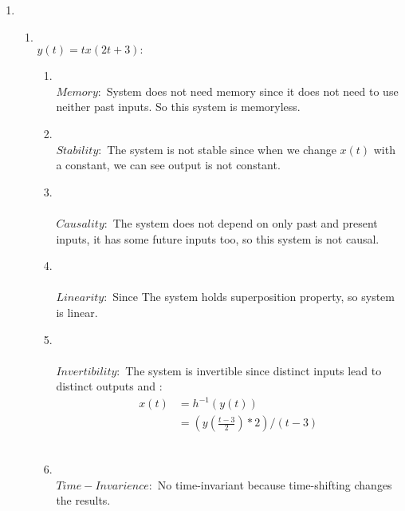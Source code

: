 \documentclass[10pt,a4paper, margin=1in]{article}
\begin{document}
\begin{enumerate}
\vspace{50}    
\item %
    \begin{enumerate}
    \item %
        \\$y(t) = tx(2t+3): $
        \\
        \begin{enumerate}
            \item
            \\$Memory: $
            System does not need memory since it does not need to use neither past inputs. So this system is memoryless.
            \\
            \item
            \\$Stability: $
            The system is not stable since when we change $x(t)$ with a constant, we can see output is not constant.
            \\
            \item
            \\\\$Causality: $
            The system does not depend on only past and present inputs, it has some future inputs too, so this system is not causal.
            \\
            \item
            \\\\$Linearity: $
            Since The system holds superposition property, so system is linear.
            \\
            \item
            \\\\$Invertibility: $
            The system is invertible since distinct inputs lead to distinct outputs and :
                \begin{align*}
                    x(t) &= h^{-1}(y(t)) 
                     \\&= (y(\frac{t-3}{2})*2) / (t-3) 
                \end{align*}
            \\
            \item
            \\$Time-Invarience:$
            No time-invariant because time-shifting changes the results.
            \\
        \end{enumerate}

\end{enumerate}
\end{enumerate}
\end{document}
